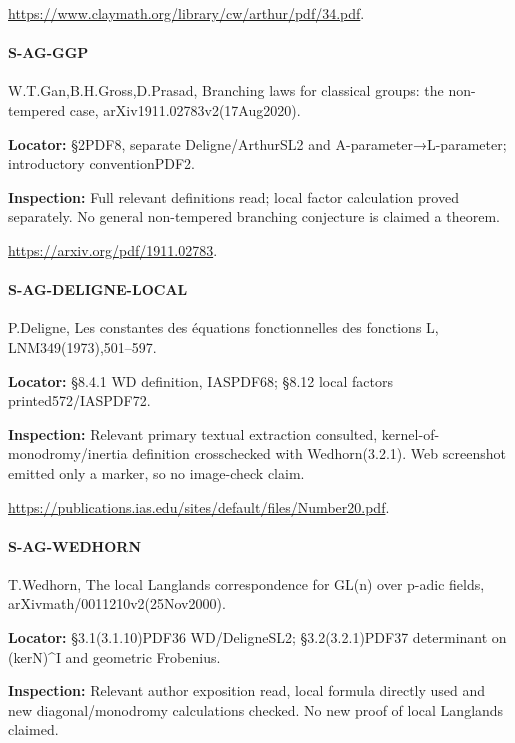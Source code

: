 \documentclass[11pt,a4paper]{article}
\begin{document}
\url{https://www.claymath.org/library/cw/arthur/pdf/34.pdf}.

\paragraph{S-AG-GGP} W.\allowbreak{}T.\allowbreak{}Gan,B.\allowbreak{}H.\allowbreak{}Gross,D.\allowbreak{}Prasad, Branching laws for classical groups:\allowbreak{} the non-tempered case, arXiv1911.\allowbreak{}02783v2(17Aug2020).

\textbf{Locator:} §2PDF8, separate Deligne/\allowbreak{}ArthurSL2 and A-parameter→L-parameter; introductory conventionPDF2.

\textbf{Inspection:} Full relevant definitions read; local factor calculation proved separately.\allowbreak{} No general non-tempered branching conjecture is claimed a theorem.\allowbreak{}

\url{https://arxiv.org/pdf/1911.02783}.

\paragraph{S-AG-DELIGNE-LOCAL} P.\allowbreak{}Deligne, Les constantes des équations fonctionnelles des fonctions L, LNM349(1973),501–\allowbreak{}597.

\textbf{Locator:} §8.\allowbreak{}4.\allowbreak{}1 WD definition, IASPDF68; §8.\allowbreak{}12 local factors printed572/\allowbreak{}IASPDF72.

\textbf{Inspection:} Relevant primary textual extraction consulted, kernel-of-monodromy/\allowbreak{}inertia definition crosschecked with Wedhorn(3.\allowbreak{}2.\allowbreak{}1).\allowbreak{} Web screenshot emitted only a marker, so no image-check claim.\allowbreak{}

\url{https://publications.ias.edu/sites/default/files/Number20.pdf}.

\paragraph{S-AG-WEDHORN} T.\allowbreak{}Wedhorn, The local Langlands correspondence for GL(n) over p-adic fields, arXivmath/\allowbreak{}0011210v2(25Nov2000).

\textbf{Locator:} §3.\allowbreak{}1(3.\allowbreak{}1.\allowbreak{}10)PDF36 WD/\allowbreak{}DeligneSL2; §3.\allowbreak{}2(3.\allowbreak{}2.\allowbreak{}1)PDF37 determinant on (kerN)\textasciicircum{}I and geometric Frobenius.

\textbf{Inspection:} Relevant author exposition read, local formula directly used and new diagonal/\allowbreak{}monodromy calculations checked.\allowbreak{} No new proof of local Langlands claimed.\allowbreak{}
\end{document}
